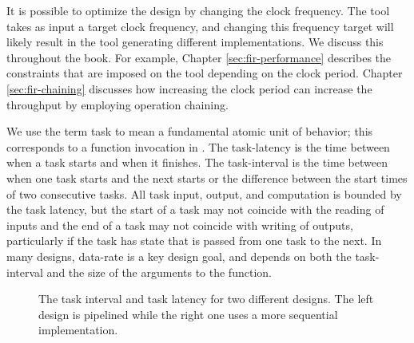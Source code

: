 \begin{aside}
It is possible to optimize the design by changing the clock frequency. The \VHLS tool takes as input a target clock frequency, and changing this frequency target will likely result in the tool generating different implementations. We discuss this throughout the book. For example, Chapter \ref{sec:fir-performance} describes the constraints that are imposed on the \VHLS tool depending on the clock period. Chapter \ref{sec:fir-chaining} discusses how increasing the clock period can increase the throughput by employing operation chaining.
\end{aside}

We use the term \gls{task} to mean a fundamental atomic unit of behavior; this corresponds to a function invocation in \VHLS.  The \gls{task-latency} is the time between when a task starts and when it finishes.  The \gls{task-interval} is the time between when one task starts and the next starts or the difference between the start times of two consecutive tasks.  All task input, output, and computation is bounded by the task latency, but the start of a task may not coincide with the reading of inputs and the end of a task may not coincide with writing of outputs, particularly if the task has state that is passed from one task to the next.  In many designs, \gls{data-rate} is a key design goal, and depends on both the \gls{task-interval} and the size of the arguments to the function.

\begin{figure}
\centering
\def\svgwidth{\columnwidth}

\caption{The task interval and task latency for two different designs. The left design is pipelined while the right one uses a more sequential implementation.}
\label{fig:intervalDuration}
\end{figure}

